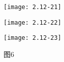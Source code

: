 \begin{figure}[H] %
	\begin{minipage}{\linewidth}
		\texttt{[image: 2.12-21]}
	\end{minipage}
\end{figure}

\begin{figure}[H] %
	\begin{minipage}{\linewidth}
		\texttt{[image: 2.12-22]}
	\end{minipage}
\end{figure}


		\begin{figure}[H] %
	\begin{minipage}{\linewidth}
		\texttt{[image: 2.12-23]}
	\end{minipage}
	\caption*{图6} %
\end{figure}

\color{black}{}